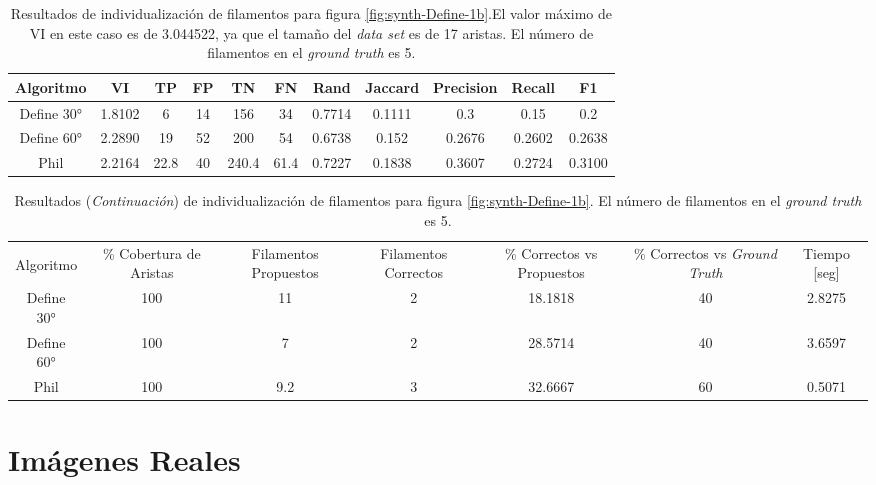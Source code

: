\begin{table}[h]
    \centering
    \begin{tabular}{|c|c|c|c|c|c|c|c|c|c|c|}
    \hline
        Algoritmo & VI & TP & FP &TN &FN & Rand	& Jaccard &	Precision &	Recall &	F1 \\ \hline
        Define 30° & 1.8102 & 6 & 14 & 156  & 34 & 0.7714 & 0.1111  & 0.3 & 0.15 & 0.2\\
        Define 60° & 2.2890 & 19 & 52 & 200 & 54 & 0.6738 & 0.152 & 0.2676  & 0.2602  & 0.2638\\ 
        Phil & 2.2164 & 22.8 & 40 & 240.4 & 61.4 & 0.7227 & 0.1838 & 0.3607 & 0.2724 & 0.3100\\
        \hline
    \end{tabular}
    \caption{Resultados de individualizaci\'on de filamentos para figura \ref{fig:synth-Define-1b}.El valor m\'aximo de VI en este caso es de 3.044522, ya que el tama\~no del {\it data set} es de 17 aristas. El n\'umero de filamentos en el {\it ground truth} es 5.}
    \label{tab:synth-Define-1b}
\end{table}
\addtocounter{table}{-1}
\begin{table}[h]
    \centering
    \begin{tabular}{|c|c|c|c|c|c|c|}
    \hline
         & \multirow{4}{2cm}{\centering \% Cobertura de Aristas} & \multirow{4}{2cm}{Filamentos Propuestos} & \multirow{4}{2cm}{Filamentos Correctos} & \multirow{4}{2.5cm}{\% Correctos vs Propuestos} & \multirow{4}{2.5cm}{\centering \% Correctos vs {\it Ground Truth}} & \multirow{4}{1.2cm}{\centering Tiempo [seg]} \\
         &  &  &  & & &  \\
        Algoritmo &  &  &  & & &  \\
        &  &  &  & & &  \\ \hline
        Define 30° & 100 & 11 & 2 & 18.1818 & 40 & 2.8275\\
        Define 60° & 100 & 7 & 2 & 28.5714 & 40 & 3.6597\\ 
        Phil & 100 & 9.2 & 3 & 32.6667 & 60 & 0.5071\\
        \hline
    \end{tabular}
    \caption{Resultados ({\it Continuaci\'on}) de individualizaci\'on de filamentos para figura \ref{fig:synth-Define-1b}. El n\'umero de filamentos en el {\it ground truth} es 5.}
\end{table}

\section{Im\'agenes Reales}

